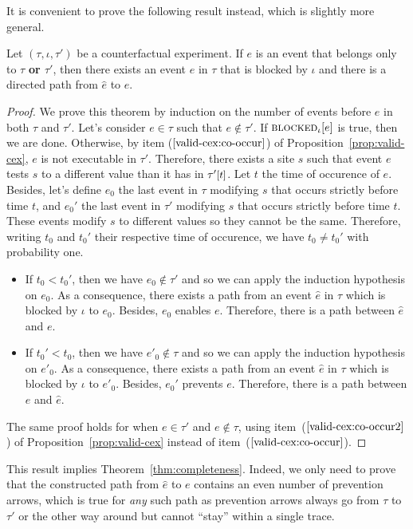 It is convenient to prove the following result instead, which is
slightly more general.
\begin{theorem*} Let $(\tau, \iota, \tau')$ be a counterfactual
  experiment. If $e$ is an event that belongs only to $\tau$
  \textbf{or $\tau'$}, then there exists an event $\hat e$ in
  $\tau$ that is blocked by $\iota$ and there is a directed path 
  from $\hat e$ to $e$.
\end{theorem*}
\begin{proof}
  We prove this theorem by induction on the number of events before
  $e$ in both $\tau$ and $\tau'$. Let's consider $e \in \tau$ such
  that $e \notin \tau'$. If ${\textsc{blocked}}_{\iota}[e]$ is true, then we are
  done. Otherwise, by item ($\ref{valid-cex:co-occur}$) of
  Proposition~\ref{prop:valid-cex}, $e$ is not executable in
  $\tau'$. Therefore, there exists a site $s$ such that event $e$
  tests $s$ to a different value than it has in $\TSTATE{t}{\tau'}$.
  Let $t$ the time of occurence of $e$.  Besides, let's define $e_0$
  the last event in $\tau$ modifying $s$ that occurs strictly before
  time $t$, and $e_0'$ the last event in $\tau'$ modifying $s$ that
  occurs strictly before time $t$. These events modify $s$ to
  different values so they cannot be the same. Therefore, writing
  $t_0$ and $t_0'$ their respective time of occurence, we have
  $t_0 \neq t_0'$ with probability one.

  \begin{itemize}
  \item If $t_0 < t_0'$, then we have $e_0 \notin \tau'$
    and so we can apply the induction hypothesis on $e_0$. As a
    consequence, there exists a path from an event $\hat e$ in $\tau$
    which is blocked by $\iota$ to $e_0$. Besides, $e_0$ enables
    $e$. Therefore, there is a path between $\hat e$ and $e$.
  \item If $t_0' < t_0$, then we have $e'_0 \notin \tau$
    and so we can apply the induction hypothesis on $e'_0$. As a
    consequence, there exists a path from an event $\hat e$ in $\tau$
    which is blocked by $\iota$ to $e'_0$. Besides, $e_0'$ prevents
    $e$. Therefore, there is a path between $e$ and $\hat e$.
  \end{itemize}
  The same proof holds for when $e \in \tau'$ and $e \notin \tau$,
  using item~($\ref{valid-cex:co-occur2}$) of
  Proposition~\ref{prop:valid-cex} instead of
  item~($\ref{valid-cex:co-occur}$).
\end{proof}
This result implies Theorem~\ref{thm:completeness}. Indeed, we only
need to prove that the constructed path from $\hat e$ to $e$ contains
an even number of prevention arrows, which is true for \textit{any}
such path as prevention arrows always go from $\tau$ to $\tau'$ or the
other way around but cannot ``stay'' within a single trace.
